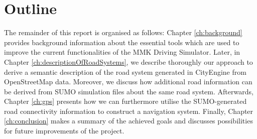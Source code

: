 \section{Outline}
\label{sec:outline}
The remainder of this report is organised as follows: Chapter \ref{ch:background} provides background information about the essential tools which are used to improve the current functionalities of the MMK Driving Simulator. Later, in Chapter \ref{ch:descriptionOfRoadSystems}, we describe thoroughly our approach to derive a semantic description of the road system generated in CityEngine from OpenStreetMap data. Moreover, we discuss how additional road information can be derived from SUMO simulation files about the same road system. Afterwards, Chapter \ref{ch:gps} presents how we can furthermore utilise the SUMO-generated road connectivity information to construct a navigation system. Finally, Chapter \ref{ch:conclusion} makes a summary of the achieved goals and discusses possibilities for future improvements of the project.


